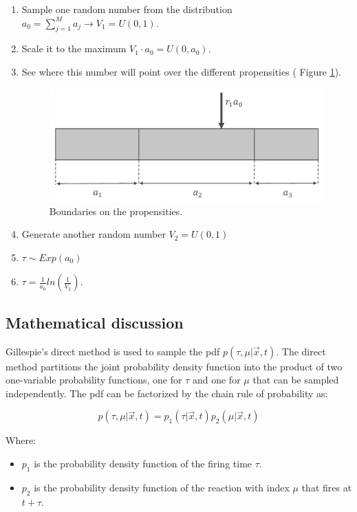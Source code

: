 \begin{enumerate}
  \item Sample one random number from the distribution $a_0 = \sum_{j=1}^{M}{a_j}\rightarrow V_1=U(0,1)$.
  \item Scale it to the maximum $V_1 \cdot a_0 =U(0,a_0)$.
  \item See where this number will point over the different propensities ( Figure \ref{fig:boundaries}).

    \begin{figure}[H]
      \centering
      \includegraphics[width=\textwidth]{boundaries.png}
      \caption{Boundaries on the propensities.}
      \label{fig:boundaries}
    \end{figure}

  \item Generate another random number $V_2 =U(0,1)$ \item $\tau \sim Exp(a_0)$ \item $\tau = \frac{1}{a_0}ln(\frac{1}{V_2})$.
\end{enumerate}

  \subsection{Mathematical discussion}
  Gillespie's direct method is used to sample the pdf $p(\tau, \mu|\vec{x},t)$.
  The direct method partitions the joint probability density function into the product of two one-variable probability functions, one for $\tau$ and one for $\mu$ that can be sampled independently.
  The pdf can be factorized by the chain rule of probability as:

  $$p(\tau, \mu|\vec{x},t) = p_1(\tau|\vec{x},t)p_2(\mu|\vec{x},t)$$

  Where:

  \begin{multicols}{2}
    \begin{itemize}
      \item $p_1$ is the probability density function of the firing time $\tau$.
      \item $p_2$ is the probability density function of the reaction with index $\mu$ that fires at $t+\tau$.
    \end{itemize}
  \end{multicols}

